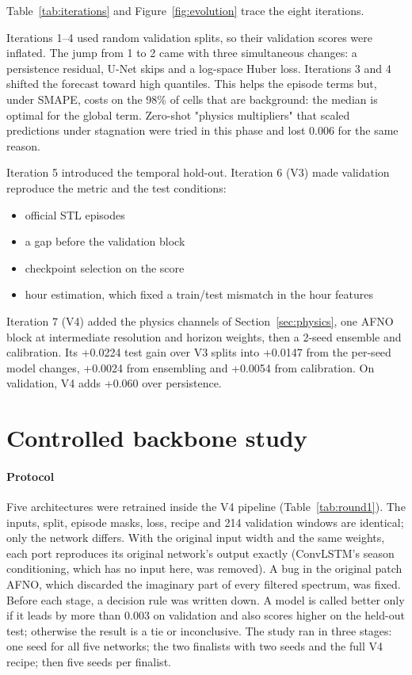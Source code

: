 \documentclass[10pt]{article}
\begin{document}
Table~\ref{tab:iterations} and Figure~\ref{fig:evolution} trace the eight iterations.

Iterations 1--4 used random validation splits, so their validation scores were inflated. The jump from 1 to 2 came with three simultaneous changes: a persistence residual, U-Net skips and a log-space Huber loss. Iterations 3 and 4 shifted the forecast toward high quantiles. This helps the episode terms but, under SMAPE, costs on the 98\% of cells that are background: the median is optimal for the global term. Zero-shot "physics multipliers" that scaled predictions under stagnation were tried in this phase and lost 0.006 for the same reason.

Iteration 5 introduced the temporal hold-out. Iteration 6 (V3) made validation reproduce the metric and the test conditions:
\begin{itemize}[leftmargin=14pt]
\item official STL episodes
\item a gap before the validation block
\item checkpoint selection on the score
\item hour estimation, which fixed a train/test mismatch in the hour features
\end{itemize}

Iteration 7 (V4) added the physics channels of Section~\ref{sec:physics}, one AFNO block at intermediate resolution and horizon weights, then a 2-seed ensemble and calibration. Its +0.0224 test gain over V3 splits into +0.0147 from the per-seed model changes, +0.0024 from ensembling and +0.0054 from calibration. On validation, V4 adds +0.060 over persistence.

\section{Controlled backbone study}
\label{sec:study}

\paragraph{Protocol}
Five architectures were retrained inside the V4 pipeline (Table~\ref{tab:round1}). The inputs, split, episode masks, loss, recipe and 214 validation windows are identical; only the network differs. With the original input width and the same weights, each port reproduces its original network's output exactly (ConvLSTM's season conditioning, which has no input here, was removed). A bug in the original patch AFNO, which discarded the imaginary part of every filtered spectrum, was fixed. Before each stage, a decision rule was written down. A model is called better only if it leads by more than 0.003 on validation and also scores higher on the held-out test; otherwise the result is a tie or inconclusive. The study ran in three stages: one seed for all five networks; the two finalists with two seeds and the full V4 recipe; then five seeds per finalist.
\end{document}

